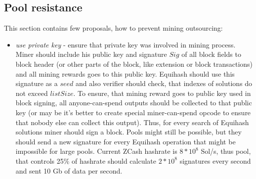 \subsection{Pool resistance}

This section contains few proposals, how to prevent mining outsourcing:

\begin{itemize}
    \item{\em use private key } - ensure that private key was involved in mining process.
    Miner should include his public key and signature $Sig$ of all block fields to block header
    (or other parts of the block, like extension or block transactions)
    and all mining rewards goes to this public key.
    Equihash should use this signature as a $seed$ and also verifier should check, that indexes of solutions do
    not exceed $listSize$.
    To ensure, that mining reward goes to public key used in block signing, all anyone-can-spend outputs should
    be collected to that public key (or may be it's better to create special miner-can-spend opcode to ensure
    that nobody else can collect this output).
    Thus, for every search of Equihash solutions miner should sign a block.
    Pools might still be possible, but they should send a new signature for every Equihash operation that might
    be impossible for large pools. Current ZCash hashrate is $8*10^8$ Sol/s, thus pool, that controls 25\%
    of hashrate should calculate $2*10^8$ signatures every second and sent 10 Gb of data per second.

\end{itemize}
